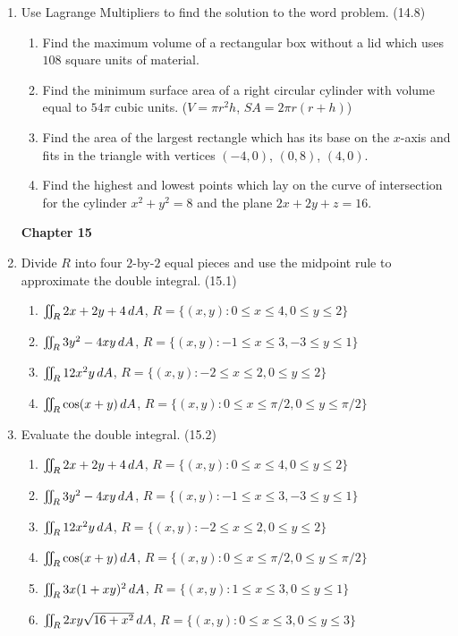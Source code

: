 \begin{enumerate}
    \item Use Lagrange Multipliers to find the solution to the word problem. (14.8)

      \begin{enumerate}%
        \item Find the maximum volume of a rectangular box without a lid which uses $108$ square units of material.
        \item Find the minimum surface area of a right circular cylinder with volume equal to $54\pi$ cubic units. ($V=\pi r^2h$, $SA=2\pi r(r+h)$)
        \item Find the area of the largest rectangle which has its base on the $x$-axis and fits in the triangle with vertices $(-4,0)$, $(0,8)$, $(4,0)$.
        \item Find the highest and lowest points which lay on the curve of intersection for the cylinder $x^2+y^2=8$ and the plane $2x+2y+z=16$.
      \end{enumerate}

\newpage
\centerline{\bf Chapter 15}

    \item Divide $R$ into four $2$-by-$2$ equal pieces and use the midpoint rule to approximate the double integral. (15.1)

      \begin{enumerate}
        \item $\iint_R 2x+2y+4 \,d{A}$, $R = \{(x,y) : 0\leq x\leq 4, 0\leq y\leq 2\}$
        \item $\iint_R 3y^2-4xy\,d{A}$, $R = \{(x,y) : -1\leq x\leq 3, -3\leq y\leq 1\}$
        \item $\iint_R 12x^2y\,d{A}$, $R = \{ (x,y) : -2\leq x\leq 2, 0\leq y\leq 2\}$
        \item $\iint_R \cos(x+y)\,d{A}$, $R = \{ (x,y) : 0\leq x\leq \pi/2, 0\leq y\leq \pi/2\}$
      \end{enumerate}

    \item Evaluate the double integral. (15.2)

      \begin{enumerate}
        \item $\iint_R 2x+2y+4 \,d{A}$, $R = \{(x,y) : 0\leq x\leq 4, 0\leq y\leq 2\}$
        \item $\iint_R 3y^2-4xy\,d{A}$, $R = \{(x,y) : -1\leq x\leq 3, -3\leq y\leq 1\}$
        \item $\iint_R 12x^2y\,d{A}$, $R = \{ (x,y) : -2\leq x\leq 2, 0\leq y\leq 2\}$
        \item $\iint_R \cos(x+y)\,d{A}$, $R = \{ (x,y) : 0\leq x\leq \pi/2, 0\leq y\leq \pi/2\}$
        \item $\iint_R 3x(1+xy)^2\,d{A}$, $R = \{ (x,y) : 1\leq x\leq 3, 0\leq y\leq 1 \}$
        \item $\iint_R 2xy\sqrt{16+x^2}\,d{A}$, $R = \{ (x,y): 0\leq x\leq 3, 0\leq y\leq 3 \}$ 
      \end{enumerate}


\end{enumerate}
